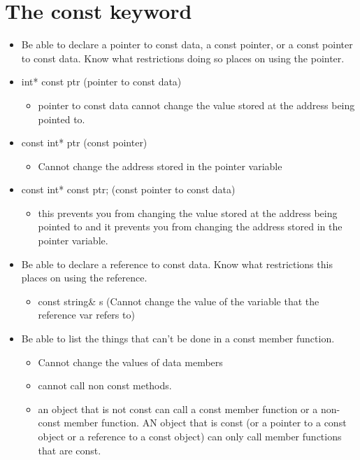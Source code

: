 \documentclass{report}
\begin{document}
\section{The const keyword}
\begin{itemize}
  \item Be able to declare a pointer to const data, a const pointer, or a const pointer to const data. Know what restrictions doing so places on using the pointer.
\end{itemize}
\bigbreak \noindent
\begin{itemize}
  \item int* const ptr (pointer to const data)
    \begin{itemize}[label=$\circ$]
      \item pointer to const data cannot change the value stored at the address being pointed to. 
      
    \end{itemize}
  \item const int* ptr (const pointer)
    \begin{itemize}[label=$\circ$]
      \item Cannot change the address stored in the pointer variable
    \end{itemize}
  \item const int* const ptr; (const pointer to const data)
    \begin{itemize}[label=$\circ$]
      \item this prevents you from changing the value stored at the address being pointed to and it prevents you from changing the address stored in the pointer variable.
    \end{itemize}
\end{itemize}
\bigbreak \noindent \bigbreak \noindent
    \begin{itemize}
      \item Be able to declare a reference to const data. Know what restrictions this places on using the reference.
    \begin{itemize}[label=$\circ$]
      \item const string\& s (Cannot change the value of the variable that the reference var refers to)
    \end{itemize}
  \item Be able to list the things that can't be done in a const member function.
    \begin{itemize}[label=$\circ$]
      \item Cannot change the values of data members
        \item cannot call non const methods.
        \item an object that is not const can call a const member function or a non-const member function. AN object that is const (or a pointer to a const object or a reference to a const object) can only call member functions that are const.
    \end{itemize}
    \end{itemize} 
\end{document}

